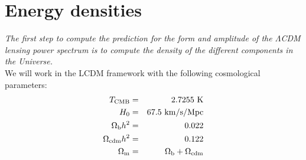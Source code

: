 \documentclass[a4paper, 11pt]{article}
\def\ba{\begin{eqnarray}}
\def\ea{\end{eqnarray}}
\begin{document}
\section{Energy densities}


{\it The first step to compute the prediction for the form and amplitude of the $\Lambda$CDM lensing power spectrum is to compute the density of the different components in the Universe.}  \\

We will work in the LCDM framework with the following cosmological parameters:
\ba
T_{\rm CMB} &=& 2.7255 \  \rm{K} \nonumber \\
H_{0} &=& 67.5 \ \rm{ km/s/Mpc} \nonumber   \\
\Omega_{\rm b}h^{2} &=& 0.022 \nonumber   \\
\Omega_{\rm cdm}h^{2} &=& 0.122  \nonumber \\
\Omega_{\rm m} &=&  \Omega_{\rm b} +  \Omega_{\rm cdm}
\ea
\end{document}
